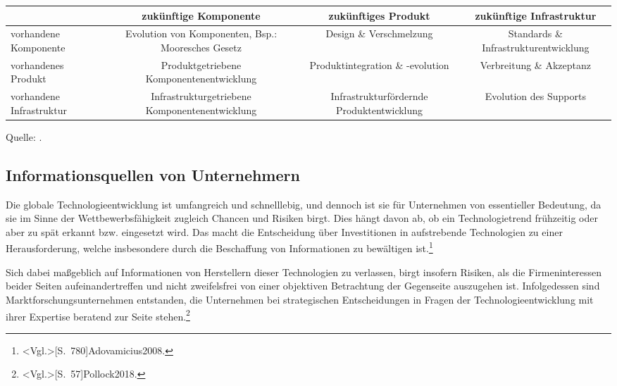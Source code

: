 \begin{center}
\label{tab:influence_path}
\begin{tabulary}{\textwidth}{|L|C|C|C|}
	\hline
	 & zukünftige Komponente & zukünftiges Produkt & zukünftige Infrastruktur \\ 
	\hline 
	vorhandene Komponente & Evolution von Komponenten, Bsp.: \newline Mooresches Gesetz & Design \& Verschmelzung & Standards \& Infrastruktur\-entwicklung \\ 
	\hline 
	vorhandenes Produkt & Produktgetriebene Komponenten\-entwicklung & Produktintegration \& -evolution & Verbreitung \& Akzeptanz \\ 
	\hline 
	vorhandene Infrastruktur & Infrastrukturgetriebene Komponenten\-entwicklung & Infrastruktur\-fördernde Produktentwicklung & Evolution des Supports \\ 
	\hline
\end{tabulary}\par
\smallskip
Quelle: .
\end{center}


%
%
%
%

\subsection{Informationsquellen von Unternehmern}
Die globale Technologieentwicklung ist umfangreich und schnelllebig, und dennoch ist sie für Unternehmen von essentieller Bedeutung, da sie im Sinne der Wettbewerbsfähigkeit zugleich Chancen und Risiken birgt. Dies hängt davon ab, ob ein Technologietrend frühzeitig oder aber zu spät erkannt bzw. eingesetzt wird. Das macht die Entscheidung über Investitionen in aufstrebende Technologien zu einer Herausforderung, welche insbesondere durch die Beschaffung von Informationen zu bewältigen ist.\footnote{\citeNP<Vgl.>[S.~780]{Adovamicius2008}.}

Sich dabei maßgeblich auf Informationen von Herstellern dieser Technologien zu verlassen, birgt insofern Risiken, als die Firmeninteressen beider Seiten aufeinandertreffen und nicht zweifelsfrei von einer objektiven Betrachtung der Gegenseite auszugehen ist. Infolgedessen sind Marktforschungsunternehmen entstanden, die Unternehmen bei strategischen Entscheidungen in Fragen der Technologieentwicklung mit ihrer Expertise beratend zur Seite stehen.\footnote{\citeNP<Vgl.>[S.~57]{Pollock2018}.}

